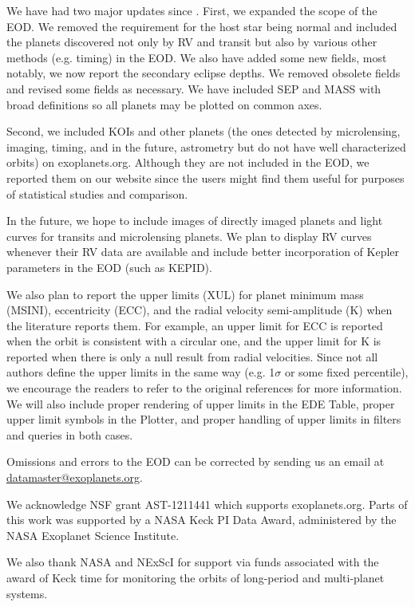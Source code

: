 \documentclass[11pt,preprint]{aastex}
\begin{document}
\begin{CJK*}{UTF8}{gbsn}
We have had two major updates since \cite{Wright2011}. First, we
expanded the scope of the EOD. We removed the requirement for the host
star being normal and included the planets discovered not only by RV
and transit but also by various other methods (e.g. timing) in the
EOD. We also have added some new fields, most notably, we now report
the secondary eclipse depths. We removed obsolete fields and revised
some fields as necessary. We have included SEP and MASS with broad
definitions so all planets may be plotted on common axes.

Second, we included KOIs and other planets (the ones detected by
microlensing, imaging, timing, and in the future, astrometry but do
not have well characterized orbits) on exoplanets.org. Although they
are not included in the EOD, we reported them on our website since the
users might find them useful for purposes of statistical studies and
comparison.

In the future, we hope to include images of directly imaged planets
and light curves for transits and microlensing planets. We plan to
display RV curves whenever their RV data are available and include
better incorporation of Kepler parameters in the EOD (such as KEPID).

We also plan to report the upper limits (XUL) for planet minimum mass (MSINI),
eccentricity (ECC), and the radial velocity semi-amplitude (K) when
the literature reports them. For example, an upper limit for ECC is
reported when the orbit is consistent with a circular one, and the
upper limit for K is reported when there is only a null result from
radial velocities. Since not all authors define the upper limits in the same
way (e.g. 1$\sigma$ or some fixed percentile), we encourage the
readers to refer to the original references for more information. We
will also include proper rendering of upper limits in the EDE Table,
proper upper limit symbols in the Plotter, and proper handling of
upper limits in filters and queries in both cases. 
 
Omissions and errors to the EOD can be corrected by sending us an
email at \url{datamaster@exoplanets.org}.


\acknowledgments

We acknowledge NSF grant AST-1211441 which supports exoplanets.org.
Parts of this work was supported by a NASA Keck PI Data Award, administered by
the NASA Exoplanet Science Institute.

We also thank NASA and NExScI for support via funds associated with
the award of Keck time for monitoring the orbits of long-period and
multi-planet systems.


\end{CJK*}
\end{document}
